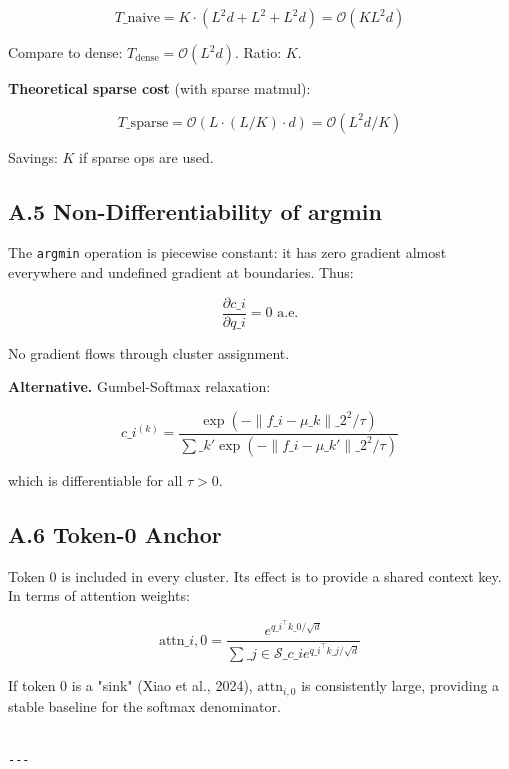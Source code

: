 \[
T\_\text{naive} = K \cdot \left( L^2 d + L^2 + L^2 d \right) = \mathcal{O}(K L^2 d)
\tag{A.4}
\]

Compare to dense: $T_\text{dense} = \mathcal{O}(L^2 d)$. Ratio: $K$.

\textbf{Theoretical sparse cost} (with sparse matmul):

\[
T\_\text{sparse} = \mathcal{O}(L \cdot (L/K) \cdot d) = \mathcal{O}(L^2 d / K)
\tag{A.5}
\]

Savings: $K$ if sparse ops are used.

\subsection{A.5 Non-Differentiability of argmin}

The \texttt{argmin} operation is piecewise constant: it has zero gradient almost 
everywhere and undefined gradient at boundaries. Thus:

\[
\frac{\partial c\_i}{\partial q\_i} = 0 \text{ a.e.}
\tag{A.6}
\]

No gradient flows through cluster assignment.

\textbf{Alternative.} Gumbel-Softmax relaxation:

\[
c\_i^{(k)} = \frac{\exp(-\|f\_i - \mu\_k\|\_2^2 / \tau)}{\sum\_{k'} \exp(-\|f\_i - \mu\_{k'}\|\_2^2 / \tau)}
\tag{A.7}
\]

which is differentiable for all $\tau > 0$.

\subsection{A.6 Token-0 Anchor}

Token 0 is included in every cluster. Its effect is to provide a shared 
context key. In terms of attention weights:

\[
\text{attn}\_{i,0} = \frac{e^{q\_i^\top k\_0 / \sqrt{d}}}{\sum\_{j \in \mathcal{S}\_{c\_i}} e^{q\_i^\top k\_j / \sqrt{d}}}
\tag{A.8}
\]

If token 0 is a "sink" (Xiao et al., 2024), $\text{attn}_{i,0}$ is 
consistently large, providing a stable baseline for the softmax denominator.
\begin{lstlisting}

---
\end{lstlisting}